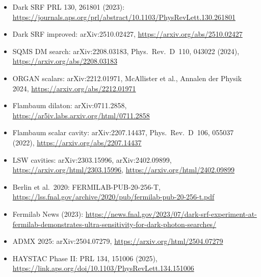 \documentclass[11pt]{article}
\theoremstyle{definition}
\theoremstyle{remark}
\begin{document}
\begin{itemize}[nosep]
\item Dark SRF PRL 130, 261801 (2023):
  \url{https://journals.aps.org/prl/abstract/10.1103/PhysRevLett.130.261801}
\item Dark SRF improved: arXiv:2510.02427,
  \url{https://arxiv.org/abs/2510.02427}
\item SQMS DM search: arXiv:2208.03183, Phys.\ Rev.\ D~110, 043022 (2024),
  \url{https://arxiv.org/abs/2208.03183}
\item ORGAN scalars: arXiv:2212.01971, McAllister et al., Annalen der Physik 2024,
  \url{https://arxiv.org/abs/2212.01971}
\item Flambaum dilaton: arXiv:0711.2858,
  \url{https://ar5iv.labs.arxiv.org/html/0711.2858}
\item Flambaum scalar cavity: arXiv:2207.14437, Phys.\ Rev.\ D~106, 055037 (2022),
  \url{https://arxiv.org/abs/2207.14437}
\item LSW cavities: arXiv:2303.15996, arXiv:2402.09899,
  \url{https://arxiv.org/html/2303.15996}, \url{https://arxiv.org/html/2402.09899}
\item Berlin et al.\ 2020: FERMILAB-PUB-20-256-T,
  \url{https://lss.fnal.gov/archive/2020/pub/fermilab-pub-20-256-t.pdf}
\item Fermilab News (2023):
  \url{https://news.fnal.gov/2023/07/dark-srf-experiment-at-fermilab-demonstrates-ultra-sensitivity-for-dark-photon-searches/}
\item ADMX 2025: arXiv:2504.07279,
  \url{https://arxiv.org/html/2504.07279}
\item HAYSTAC Phase II: PRL 134, 151006 (2025),
  \url{https://link.aps.org/doi/10.1103/PhysRevLett.134.151006}
\end{itemize}
\end{document}
